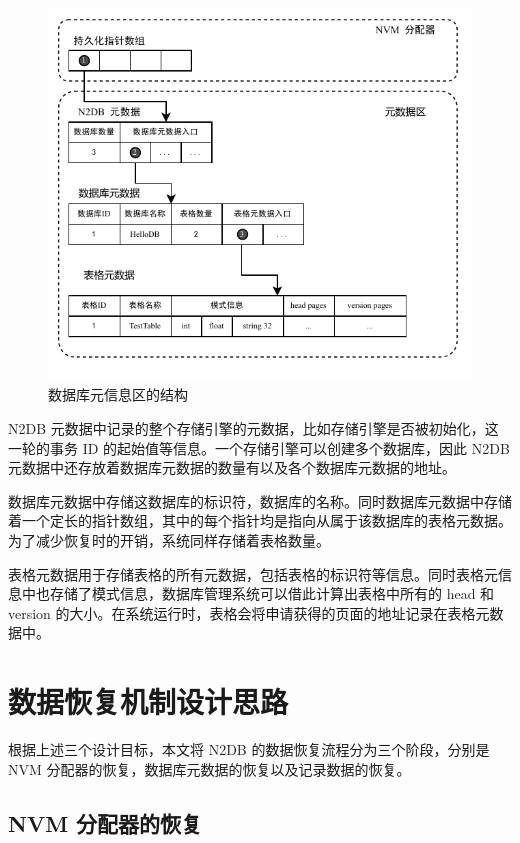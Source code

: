 \begin{figure}
    \centering
    \includegraphics[width=1\linewidth]{figures/catalog.pdf}
    \caption{数据库元信息区的结构}
    \label{fig:catalog}
\end{figure}

N2DB 元数据中记录的整个存储引擎的元数据，比如存储引擎是否被初始化，这一轮的事务 ID 的起始值等信息。一个存储引擎可以创建多个数据库，因此 N2DB 元数据中还存放着数据库元数据的数量有以及各个数据库元数据的地址。

数据库元数据中存储这数据库的标识符，数据库的名称。同时数据库元数据中存储着一个定长的指针数组，其中的每个指针均是指向从属于该数据库的表格元数据。为了减少恢复时的开销，系统同样存储着表格数量。


表格元数据用于存储表格的所有元数据，包括表格的标识符等信息。同时表格元信息中也存储了模式信息，数据库管理系统可以借此计算出表格中所有的 head 和 version 的大小。在系统运行时，表格会将申请获得的页面的地址记录在表格元数据中。




\section{数据恢复机制设计思路}

根据上述三个设计目标，本文将 N2DB 的数据恢复流程分为三个阶段，分别是 NVM 分配器的恢复，数据库元数据的恢复以及记录数据的恢复。

\subsection{NVM 分配器的恢复}
\label{ssec:allocator-recovery}

